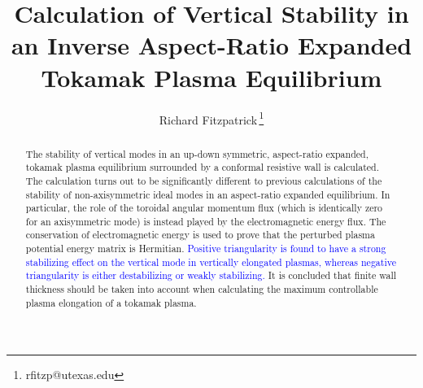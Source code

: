 \documentclass[12pt,prb,aps]{revtex4-1}
\begin{document}
\title{Calculation of Vertical Stability in an Inverse Aspect-Ratio Expanded Tokamak Plasma Equilibrium}
\author{Richard Fitzpatrick\,\footnote{rfitzp@utexas.edu}}

\begin{abstract}
The  stability of vertical modes in an up-down symmetric, aspect-ratio expanded, tokamak plasma equilibrium surrounded by
a conformal resistive wall is calculated. The calculation turns out to be significantly different to previous calculations of the stability
of non-axisymmetric ideal modes in an aspect-ratio expanded equilibrium.  In particular, the role of the toroidal angular momentum flux (which is
identically zero for an axisymmetric mode) is instead played by the electromagnetic energy flux. The conservation of electromagnetic energy is used to prove that the perturbed plasma potential energy matrix is Hermitian. 
\textcolor{blue}{Positive triangularity is
found to have a strong stabilizing effect on the vertical mode in vertically elongated plasmas, whereas negative triangularity is either destabilizing or weakly stabilizing.} It is concluded that finite wall thickness should be taken into account when
calculating the maximum controllable plasma elongation of a tokamak plasma. 
\end{abstract}

\maketitle
\end{document}
